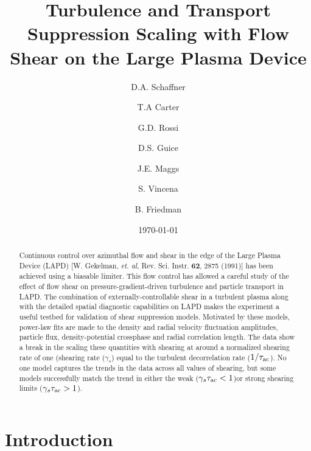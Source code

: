 \documentclass[aip,pop,amsmath,amssymb,preprint,superscriptaddress]{revtex4-1} %
\begin{document}
\title{Turbulence and Transport Suppression Scaling with Flow Shear on the Large Plasma Device}
\author{D.A. Schaffner}
\author{T.A Carter}
\author{G.D. Rossi}
\author{D.S. Guice}
\author{J.E. Maggs}
\author{S. Vincena}
\author{B. Friedman}
\date{\today}
\begin{abstract}
Continuous control over azimuthal flow and shear in the edge of the Large Plasma Device (LAPD) [W. Gekelman, \textit{et. al}, Rev. Sci. Instr. \textbf{62}, 2875 (1991)] has been achieved using a biasable limiter.  This flow control has allowed a careful study of the effect of flow shear on pressure-gradient-driven turbulence and particle transport in LAPD. The combination of externally-controllable shear in a turbulent plasma along with the detailed spatial diagnostic capabilities on LAPD makes the experiment a useful testbed for validation of shear suppression models. Motivated by these models, power-law fits are made to the density and radial velocity fluctuation amplitudes, particle flux, density-potential crossphase and radial correlation length.  The data show a break in the scaling these quantities with shearing at around a normalized shearing rate of one (shearing rate ($\gamma_s$) equal to the turbulent decorrelation rate ($1/\tau_{\rm ac}$).  No one model captures the trends in the data across all values of shearing, but some models successfully match the trend in either the weak  ($\gamma_s \tau_{\rm ac} < 1$)or strong shearing limits ($\gamma_s \tau_{\rm ac} > 1$). 
\end{abstract}
\maketitle

\section{Introduction}
\end{document}
